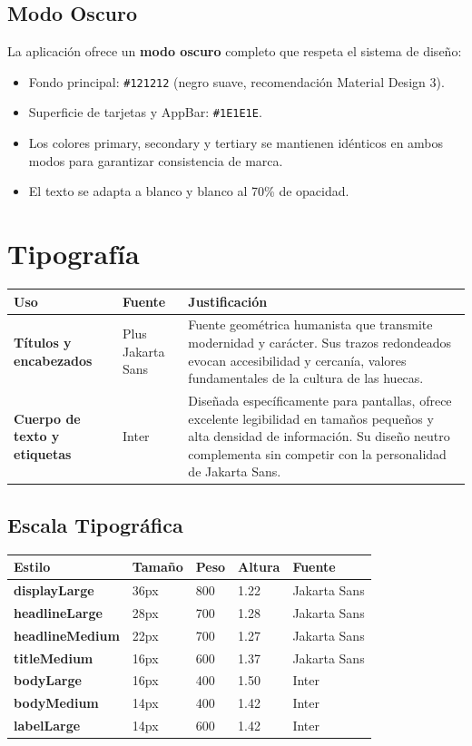\documentclass[11pt, a4paper, oneside]{report}
\begin{document}
\subsection{Modo Oscuro}

La aplicación ofrece un \textbf{modo oscuro} completo que respeta el sistema de diseño:

\begin{itemize}
  \item Fondo principal: \texttt{\#121212} (negro suave, recomendación Material Design 3).
  \item Superficie de tarjetas y AppBar: \texttt{\#1E1E1E}.
  \item Los colores primary, secondary y tertiary se mantienen idénticos en ambos modos para garantizar consistencia de marca.
  \item El texto se adapta a blanco y blanco al 70\% de opacidad.
\end{itemize}

\section{Tipografía}

\begin{longtable}{>{\bfseries}p{4cm} p{3.5cm} p{6cm}}
\toprule
\textbf{Uso} & \textbf{Fuente} & \textbf{Justificación} \\
\midrule
Títulos y encabezados & Plus Jakarta Sans & Fuente geométrica humanista que transmite modernidad y carácter. Sus trazos redondeados evocan accesibilidad y cercanía, valores fundamentales de la cultura de las huecas. \\
Cuerpo de texto y etiquetas & Inter & Diseñada específicamente para pantallas, ofrece excelente legibilidad en tamaños pequeños y alta densidad de información. Su diseño neutro complementa sin competir con la personalidad de Jakarta Sans. \\
\bottomrule
\end{longtable}

\subsection{Escala Tipográfica}

\begin{longtable}{>{\bfseries}p{3.5cm} p{2cm} p{2cm} p{2cm} p{3cm}}
\toprule
\textbf{Estilo} & \textbf{Tamaño} & \textbf{Peso} & \textbf{Altura} & \textbf{Fuente} \\
\midrule
displayLarge & 36px & 800 & 1.22 & Jakarta Sans \\
headlineLarge & 28px & 700 & 1.28 & Jakarta Sans \\
headlineMedium & 22px & 700 & 1.27 & Jakarta Sans \\
titleMedium & 16px & 600 & 1.37 & Jakarta Sans \\
bodyLarge & 16px & 400 & 1.50 & Inter \\
bodyMedium & 14px & 400 & 1.42 & Inter \\
labelLarge & 14px & 600 & 1.42 & Inter \\
\bottomrule
\end{longtable}
\end{document}
